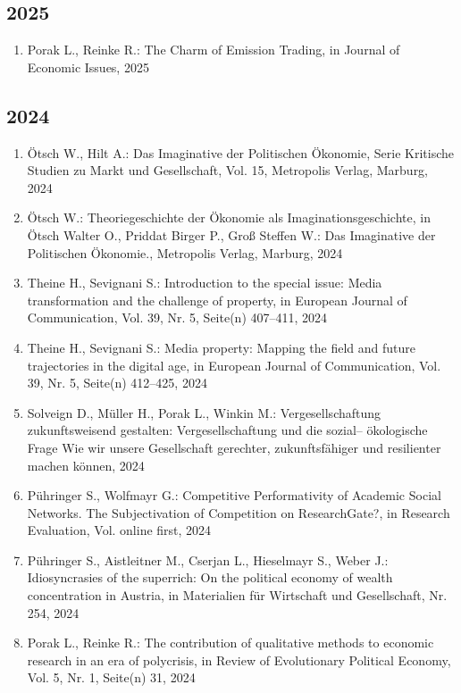 \subsection*{2025}
\begin{enumerate}
    	 \item Porak L., Reinke R.: The Charm of Emission Trading, in Journal of Economic Issues, 2025
\end{enumerate}
\subsection*{2024}
\begin{enumerate}
    	 \item Ötsch W., Hilt A.: Das Imaginative der Politischen Ökonomie, Serie Kritische Studien zu Markt und Gesellschaft, Vol. 15, Metropolis Verlag, Marburg, 2024
	 \item Ötsch W.: Theoriegeschichte der Ökonomie als Imaginationsgeschichte, in Ötsch Walter O., Priddat Birger P., Groß Steffen W.: Das Imaginative der Politischen Ökonomie., Metropolis Verlag, Marburg, 2024
	 \item Theine H., Sevignani S.: Introduction to the special issue: Media transformation and the challenge of property, in European Journal of Communication, Vol. 39, Nr. 5, Seite(n) 407–411, 2024
	 \item Theine H., Sevignani S.: Media property: Mapping the field and future trajectories in the digital age, in European Journal of Communication, Vol. 39, Nr. 5, Seite(n) 412–425, 2024
	 \item Solveign D., Müller H., Porak L., Winkin M.: Vergesellschaftung zukunftsweisend gestalten: Vergesellschaftung und die sozial-- ökologische Frage Wie wir unsere Gesellschaft gerechter, zukunftsfähiger und resilienter machen können, 2024
	 \item Pühringer S., Wolfmayr G.: Competitive Performativity of Academic Social Networks. The Subjectivation of Competition on ResearchGate?, in Research Evaluation, Vol. online first, 2024
	 \item Pühringer S., Aistleitner M., Cserjan L., Hieselmayr S., Weber J.: Idiosyncrasies of the superrich: On the political economy of wealth concentration in Austria, in Materialien für Wirtschaft und Gesellschaft, Nr. 254, 2024
	 \item Porak L., Reinke R.: The contribution of qualitative methods to economic research in an era of polycrisis, in Review of Evolutionary Political Economy, Vol. 5, Nr. 1, Seite(n) 31, 2024

\end{enumerate}
